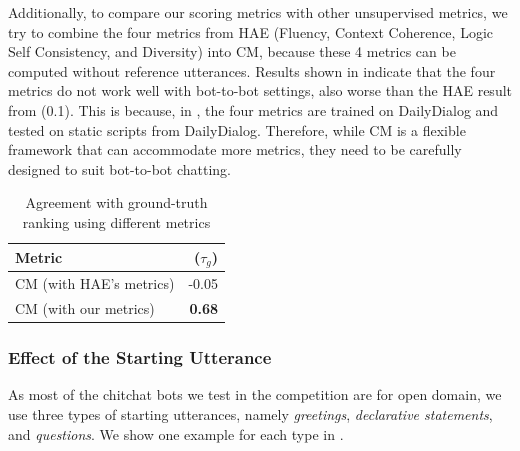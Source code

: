 Additionally, to compare our scoring metrics with other 
unsupervised metrics, we try to combine the four metrics from
 HAE (Fluency, Context Coherence, Logic Self Consistency, and Diversity) 
into CM, because these 4 metrics can be computed without reference utterances. 
Results shown in  indicate that
the four metrics do not work well with bot-to-bot settings,
also worse than the HAE result from  (0.1).
This is because, in , the four metrics are trained on 
DailyDialog and tested on static scripts from DailyDialog. 
Therefore, while CM is a flexible framework that can accommodate more
metrics, they need to be carefully designed to suit bot-to-bot chatting.

\begin{table}[th!]
\centering
\scriptsize
\begin{tabular}{lr}
\toprule
Metric  & ($\tau_{g}$)\\ \midrule
CM (with HAE's metrics) & -0.05  \\
CM (with our metrics)  & \textbf{0.68}  \\
\bottomrule
\end{tabular}
\caption{
Agreement with ground-truth ranking using different metrics
}
\label{tab:metrics}
\end{table}


\subsubsection{Effect of the Starting Utterance}

As most of the chitchat bots we test in the competition 
are for open domain, we use three types of starting utterances, 
namely {\em greetings}, {\em declarative statements}, and 
{\em questions}. 
We show one example for each type in 
.

